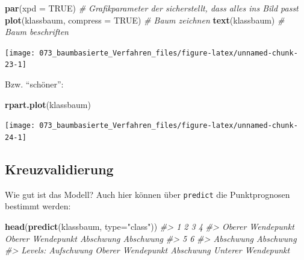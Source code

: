 \documentclass[12pt,]{book}
\makeatletter
\newenvironment{Shaded}{\begin{snugshade}}{\end{snugshade}}
\newcommand{\KeywordTok}[1]{\textcolor[rgb]{0.13,0.29,0.53}{\textbf{{#1}}}}
\newcommand{\DataTypeTok}[1]{\textcolor[rgb]{0.13,0.29,0.53}{{#1}}}
\newcommand{\StringTok}[1]{\textcolor[rgb]{0.31,0.60,0.02}{{#1}}}
\newcommand{\CommentTok}[1]{\textcolor[rgb]{0.56,0.35,0.01}{\textit{{#1}}}}
\newcommand{\OtherTok}[1]{\textcolor[rgb]{0.56,0.35,0.01}{{#1}}}
\newcommand{\NormalTok}[1]{{#1}}
\newenvironment{kframe}{%
\medskip{}
\setlength{\fboxsep}{.8em}
 \def\at@end@of@kframe{}%
 \ifinner\ifhmode%
  \def\at@end@of@kframe{\end{minipage}}%
  \begin{minipage}{\columnwidth}%
 \fi\fi%
 \def\FrameCommand##1{\hskip\@totalleftmargin \hskip-\fboxsep
 \colorbox{shadecolor}{##1}\hskip-\fboxsep
     \hskip-\linewidth \hskip-\@totalleftmargin \hskip\columnwidth}%
 \MakeFramed {\advance\hsize-\width
   \@totalleftmargin\z@ \linewidth\hsize
   \@setminipage}}%
 {\par\unskip\endMakeFramed%
 \at@end@of@kframe}
\renewenvironment{Shaded}{\begin{kframe}}{\end{kframe}}
\makeatother
\begin{document}
\begin{Shaded}
\begin{Highlighting}[]
\KeywordTok{par}\NormalTok{(}\DataTypeTok{xpd =} \OtherTok{TRUE}\NormalTok{) }\CommentTok{# Grafikparameter der sicherstellt, dass alles ins Bild passt}
\KeywordTok{plot}\NormalTok{(klassbaum, }\DataTypeTok{compress =} \OtherTok{TRUE}\NormalTok{) }\CommentTok{# Baum zeichnen}
\KeywordTok{text}\NormalTok{(klassbaum) }\CommentTok{# Baum beschriften}
\end{Highlighting}
\end{Shaded}

\begin{center}\texttt{[image: 073\_baumbasierte\_Verfahren\_files/figure-latex/unnamed-chunk-23-1]} \end{center}

Bzw. ``schöner'':

\begin{Shaded}
\begin{Highlighting}[]
\KeywordTok{rpart.plot}\NormalTok{(klassbaum)}
\end{Highlighting}
\end{Shaded}

\begin{center}\texttt{[image: 073\_baumbasierte\_Verfahren\_files/figure-latex/unnamed-chunk-24-1]} \end{center}

\subsection{Kreuzvalidierung}\label{kreuzvalidierung-1}

Wie gut ist das Modell? Auch hier können über \texttt{predict} die
Punktprognosen bestimmt werden:

\begin{Shaded}
\begin{Highlighting}[]
\KeywordTok{head}\NormalTok{(}\KeywordTok{predict}\NormalTok{(klassbaum, }\DataTypeTok{type=}\StringTok{"class"}\NormalTok{))}
\CommentTok{#>                 1                 2                 3                 4 }
\CommentTok{#> Oberer Wendepunkt Oberer Wendepunkt         Abschwung         Abschwung }
\CommentTok{#>                 5                 6 }
\CommentTok{#>         Abschwung         Abschwung }
\CommentTok{#> Levels: Aufschwung Oberer Wendepunkt Abschwung Unterer Wendepunkt}
\end{Highlighting}
\end{Shaded}
\end{document}
